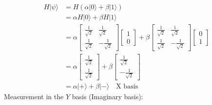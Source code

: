 \documentclass{article}
\begin{document}
\begin{align}
	\label{eq:2}
	H |\psi\rangle & = H(\alpha |0\rangle + \beta |1\rangle)                                         \\
	               & = \alpha H|0\rangle + \beta H|1\rangle                                          \\
	               & = \alpha \begin{bmatrix}
		                          \frac{1}{\sqrt{2}} & \frac{1}{\sqrt{2}}  \\
		                          \frac{1}{\sqrt{2}} & -\frac{1}{\sqrt{2}}
	                          \end{bmatrix}
	\begin{bmatrix}
		1 \\
		0
	\end{bmatrix}
	+ \beta \begin{bmatrix}
		        \frac{1}{\sqrt{2}} & \frac{1}{\sqrt{2}}  \\
		        \frac{1}{\sqrt{2}} & -\frac{1}{\sqrt{2}}
	        \end{bmatrix}
	\begin{bmatrix}
		0 \\
		1
	\end{bmatrix}                                                                                   \\
	               & = \alpha \begin{bmatrix}
		                          \frac{1}{\sqrt{2}} \\
		                          \frac{1}{\sqrt{2}}
	                          \end{bmatrix}
	+
	\beta \begin{bmatrix}
		      \frac{1}{\sqrt{2}} \\
		      -\frac{1}{\sqrt{2}}
	      \end{bmatrix}                                                          \\
	               & = \alpha |+\rangle + \beta |-\rangle \quad \text{X basis}
\end{align}
Measurement in the $Y$ basis (Imaginary basis):
\end{document}
